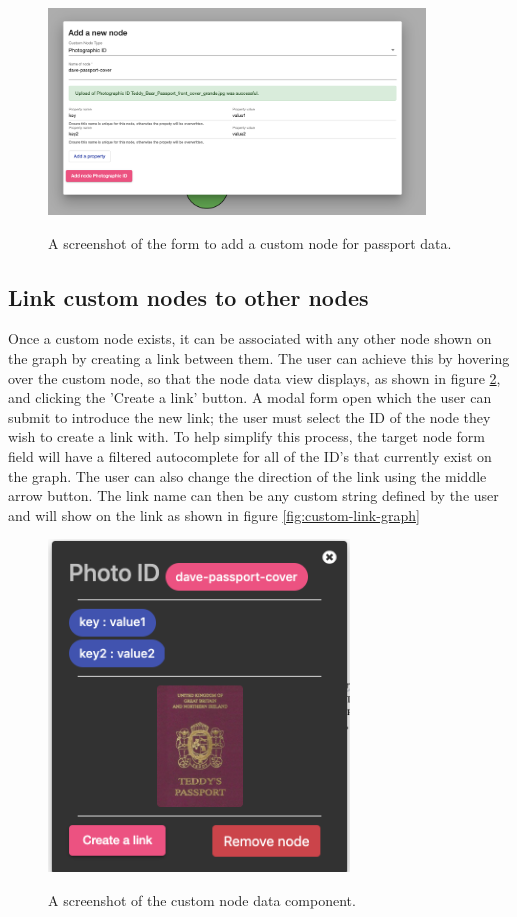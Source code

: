 \begin{figure}[h!]
  \centering
  \includegraphics[width = 10cm]{./figures/ui-screenshots/add-passport-form-success}\\[0.5cm] 
  \caption{A screenshot of the form to add a custom node for passport data.}
  \label{fig:add-passport-form}
\end{figure}

\subsection{Link custom nodes to other nodes}
Once a custom node exists, it can be associated with any other node shown on the graph by creating a link between them. The user can achieve this by hovering over the custom node, so that the node data view displays, as shown in figure \ref{fig:custom-node-data}, and clicking the 'Create a link' button. A modal form open which the user can submit to introduce the new link; the user must select the ID of the node they wish to create a link with. To help simplify this process, the target node form field will have a filtered autocomplete for all of the ID's that currently exist on the graph. The user can also change the direction of the link using the middle arrow button. The link name can then be any custom string defined by the user and will show on the link as shown in figure \ref{fig:custom-link-graph}

\begin{figure}[h!]
  \centering
  \includegraphics[width = 8cm]{./figures/ui-screenshots/custom-node-data}\\[0.5cm] 
  \caption{A screenshot of the custom node data component.}
  \label{fig:custom-node-data}
\end{figure}


